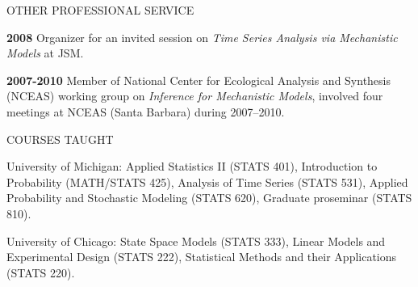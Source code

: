 \begin{mylist}{OTHER PROFESSIONAL SERVICE}
\item{\bf 2008 } Organizer for an invited session on {\it Time Series Analysis via Mechanistic Models} at JSM.

\item {\bf 2007-2010 } Member of National Center for Ecological Analysis and Synthesis (NCEAS) working group on {\it Inference for Mechanistic Models}, involved four meetings at NCEAS (Santa Barbara) during 2007--2010.
 




\end{mylist}


\lsp


\begin{mylist}{COURSES TAUGHT}

\item{University of Michigan}: 
Applied Statistics II (STATS 401), 
Introduction to Probability (MATH/STATS 425), 
Analysis of Time Series (STATS 531), 
Applied Probability and Stochastic Modeling (STATS 620), 
Graduate proseminar (STATS 810).

\item{University of Chicago}: State Space
Models (STATS 333), Linear Models and Experimental Design (STATS 222),
Statistical Methods and their Applications (STATS 220). 

\end{mylist}

\lsp

